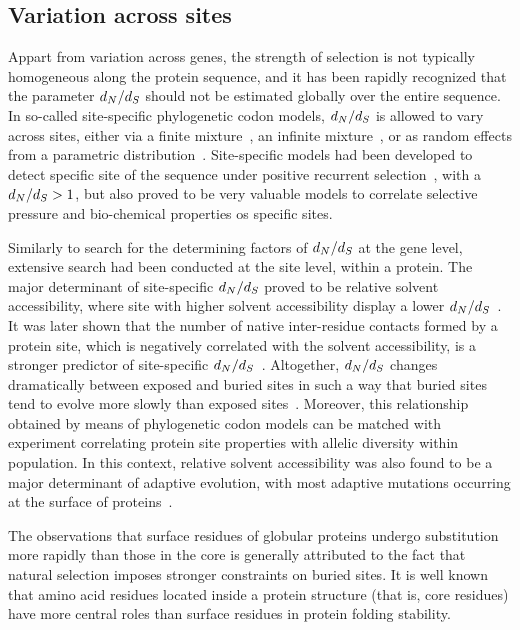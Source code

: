 \subsection{Variation across sites}

Appart from variation across genes, the strength of selection is not typically homogeneous along the protein sequence, and it has been rapidly recognized that the parameter $d_N / d_S$ should not be estimated globally over the entire sequence.
In so-called site-specific phylogenetic \gls{codon} models, $d_N / d_S$ is allowed to vary across sites, either via a finite mixture~\citep{Yang2001}, an infinite mixture~\citep{Huelsenbeck2006}, or as random effects from a parametric distribution~\citep{Lartillot2013}.
Site-specific models had been developed to detect specific site of the sequence under positive recurrent selection~\citep{kosiol_patterns_2008}, with a $d_N / d_S>1$, but also proved to be very valuable models to correlate selective pressure and bio-chemical properties os specific sites.

Similarly to search for the determining factors of $d_N / d_S$ at the gene level, extensive search had been conducted at the site level, within a protein.
The major determinant of site-specific $d_N / d_S$ proved to be relative solvent accessibility, where site with higher solvent accessibility display a lower $d_N / d_S$~\citep{Ramsey2011}.
It was later shown that the number of native inter-residue contacts formed by a protein site, which is negatively correlated with the solvent accessibility, is a stronger predictor of site-specific $d_N / d_S$~\citep{Yeh2013}.
Altogether, $d_N / d_S$ changes dramatically between exposed and buried sites in such a way that buried sites tend to evolve more slowly than exposed sites~\citep{Echave2016}.
Moreover, this relationship obtained by means of phylogenetic \gls{codon} models can be matched with experiment correlating protein site properties with allelic diversity within population.
In this context, relative solvent accessibility was also found to be a major determinant of adaptive evolution, with most adaptive mutations occurring at the surface of proteins~\citep{Moutinho2019}.

The observations that surface residues of globular proteins undergo \gls{substitution} more rapidly than those in the core is generally attributed to the fact that natural selection imposes stronger constraints on buried sites.
It is well known that amino acid residues located inside a protein structure (that is, core residues) have more central roles than surface residues in protein folding stability.

